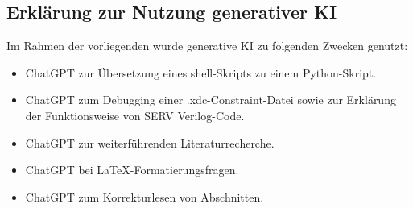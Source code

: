 \begin{otherlanguage}{ngerman}

\section*{Erklärung zur Nutzung generativer KI}

Im Rahmen der vorliegenden \thesistypegerman{} wurde generative KI zu folgenden Zwecken genutzt:


\begin{itemize}
 \item ChatGPT zur Übersetzung eines shell-Skripts zu einem Python-Skript.
 \item ChatGPT zum Debugging einer .xdc-Constraint-Datei sowie zur Erklärung der Funktionsweise von SERV Verilog-Code.
 \item ChatGPT zur weiterführenden Literaturrecherche.
 \item ChatGPT bei LaTeX-Formatierungsfragen.
 \item ChatGPT zum Korrekturlesen von Abschnitten.
\end{itemize}

\end{otherlanguage}

